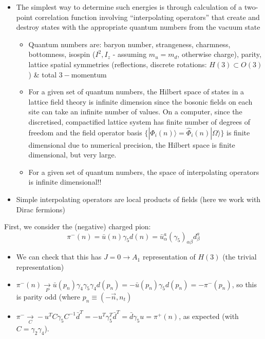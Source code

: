 \begin{itemize}
    \item The simplest way to determine such energies is through calculation of a two-point correlation function involving ``interpolating operators'' that create and destroy states with the appropriate quantum numbers from the vacuum state
    \begin{itemize}
        \item Quantum numbers are: baryon number, strangeness, charmness, bottomness, isospin ($I^2, I_z$ - assuming $m_u = m_d$, otherwise charge), parity, lattice spatial symmetries (reflections, discrete rotations: $H(3) \subset O(3)$) \& total $3-$momentum
        \item For a given set of quantum numbers, the Hilbert space of states in a lattice field theory is infinite dimension since the bosonic fields on each site can take an infinite number of values. On a computer, since the discretised, compactified lattice system has finite number of degrees of freedom and the field operator basis $\{ |\Phi_i(n) \rangle = \hat{\Phi}_i(n) | \Omega \rangle\}$ is finite dimensional due to numerical precision, the Hilbert space is finite dimensional, but very large.
        \item For a given set of quantum numbers, the space of interpolating operators is infinite dimensional!!
    \end{itemize}
    \item Simple interpolating operators are local products of fields (here we work with Dirac fermions)
\end{itemize}
First, we consider the (negative) charged pion:
\begin{equation}
    \pi^-(n) = \bar{u}(n)\gamma_5 d(n) = \bar{u}_\alpha^a (\gamma_5)_{\alpha \beta}d_\beta^a
\end{equation}
\begin{itemize}
    \item We can check that this has $J = 0 \rightarrow A_1$ representation of $H(3)$ (the trivial representation)
    \item $\pi^-(n) \underset{P}{\rightarrow} \bar{u}(p_n) \gamma_4 \gamma_5 \gamma_4 d(p_n) = - \bar{u}(p_n) \gamma_5 d(p_n) = -\pi^-(p_n)$, so this is parity odd (where $p_n \equiv (-\vec{n}, n_t)$
    \item $\pi^- \underset{C}{\rightarrow} - u^T C \gamma_5 C^{-1} \bar{d}^T = - u^T \gamma_5^T \bar{d}^T = \bar{d} \gamma_5 u = \pi^+(n)$, as expected (with $C = \gamma_2 \gamma_4$).
\end{itemize}
